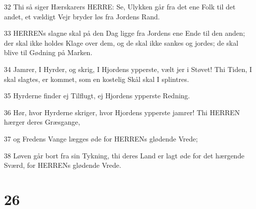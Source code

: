 \par 32 Thi så siger Hærskarers HERRE: Se, Ulykken går fra det ene Folk til det andet, et vældigt Vejr bryder løs fra Jordens Rand.
\par 33 HERRENs slagne skal på den Dag ligge fra Jordens ene Ende til den anden; der skal ikke holdes Klage over dem, og de skal ikke sankes og jordes; de skal blive til Gødning på Marken.
\par 34 Jamrer, I Hyrder, og skrig, I Hjordens ypperste, vælt jer i Støvet! Thi Tiden, I skal slagtes, er kommet, som en kostelig Skål skal I splintres.
\par 35 Hyrderne finder ej Tilflugt, ej Hjordens ypperste Redning.
\par 36 Hør, hvor Hyrderne skriger, hvor Hjordens ypperste jamrer! Thi HERREN hærger deres Græsgange,
\par 37 og Fredens Vange lægges øde for HERRENs glødende Vrede;
\par 38 Løven går bort fra sin Tykning, thi deres Land er lagt øde for det hærgende Sværd, for HERRENs glødende Vrede.

\chapter{26}

